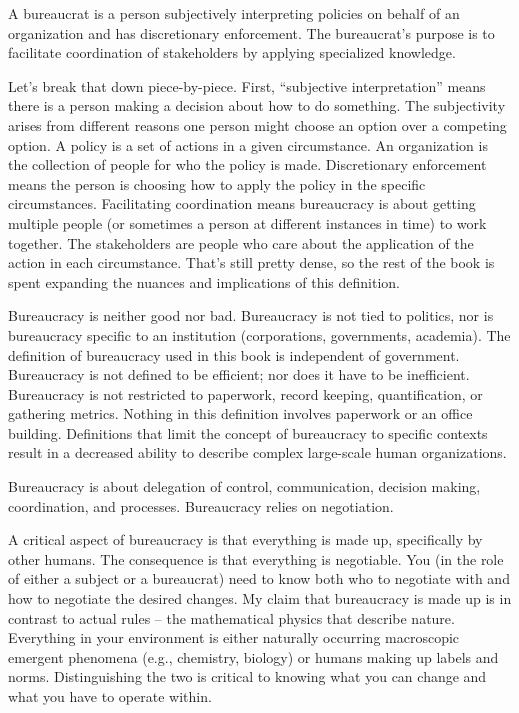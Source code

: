 A \gls{bureaucrat} is a person subjectively interpreting policies on behalf of an organization and has discretionary enforcement. The bureaucrat's purpose is to facilitate coordination of stakeholders by applying specialized knowledge. 

Let's break that down piece-by-piece. First, ``subjective interpretation'' means there is a person making a decision about how to do something. The subjectivity arises from different reasons one person might choose an option over a competing option.  A \gls{policy} is a set of actions in a given circumstance. An \gls{organization} is the collection of people for who the policy is made. Discretionary enforcement means the person is choosing how to apply the policy in the specific circumstances. Facilitating coordination means bureaucracy is about getting multiple people (or sometimes a person at different instances in time) to work together. The stakeholders are people who care about the application of the action in each circumstance.  That's still pretty dense, so the rest of the book is spent expanding the nuances and implications of this definition.

Bureaucracy is neither good nor bad. Bureaucracy is not tied to politics, nor is bureaucracy specific to an institution (corporations, governments, academia). The definition of bureaucracy used in this book is independent of government. Bureaucracy is not defined to be efficient; nor does it have to be inefficient. Bureaucracy is not restricted to paperwork, record keeping, quantification, or gathering metrics. Nothing in this definition involves paperwork or an office building. Definitions that limit the concept of bureaucracy to specific contexts result in a decreased ability to describe complex large-scale human organizations. 

Bureaucracy is about delegation of control, communication, decision making, coordination, and processes. Bureaucracy relies on negotiation. 


A critical aspect of bureaucracy is that everything is made up, specifically by other humans. The consequence is that everything is negotiable. You (in the role of either a subject or a bureaucrat) need to know both who to negotiate with and how to negotiate the desired changes. My claim that bureaucracy is made up is in contrast to actual rules -- the mathematical physics that describe nature. Everything in your environment is either naturally occurring macroscopic emergent phenomena (e.g., chemistry, biology) or humans making up labels and norms. Distinguishing the two is critical to knowing what you can change and what you have to operate within. 

